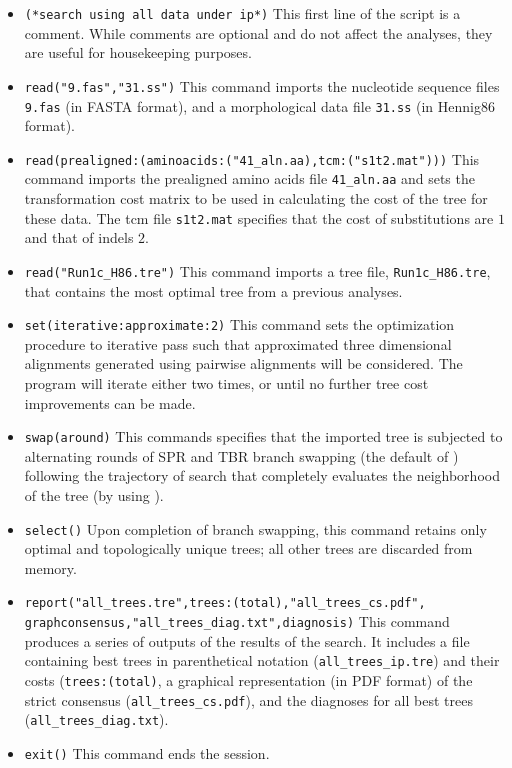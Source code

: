 \begin{itemize}
\item \texttt{(*search using all data under ip*)} This first line
of the script is a comment. While comments are optional and do not
affect the analyses, they are useful for housekeeping purposes.
\item \texttt{read("9.fas","31.ss")} This command imports the
nucleotide sequence files \texttt{9.fas} (in FASTA format), and a
morphological data file \texttt{31.ss} (in Hennig86 format).  
\item \texttt{read(prealigned:(aminoacids:("41\_aln.aa),tcm:("s1t2.mat")))}
This command imports the prealigned amino acids file \texttt{41\_aln.aa}
and sets the transformation cost matrix to be used in calculating
the cost of the tree for these data.  The tcm file \texttt{s1t2.mat}
specifies that the cost of substitutions are $1$ and that of indels
$2$.  
\item \texttt{read("Run1c\_H86.tre")} This command imports a
tree file, \texttt{Run1c\_H86.tre}, that contains the most optimal
tree from a previous analyses.  
\item \texttt{set(iterative:approximate:2)}
This command sets the optimization procedure to iterative pass such
that approximated three dimensional alignments generated using
pairwise alignments will be considered.  The program will iterate
either two times, or until no further tree cost improvements can
be made.  
\item \texttt{swap(around)} This commands specifies that
the imported tree is subjected to alternating rounds of SPR and TBR
branch swapping (the default of \poy) following the trajectory of
search that completely evaluates the neighborhood of the tree (by
using ).  
\item \texttt{select()} Upon completion
of branch swapping, this command retains only optimal and topologically
unique trees; all other trees are discarded from memory.  
\item \texttt{report("all\_trees.tre",trees:(total),"all\_trees\_cs.pdf",\\
graphconsensus,"all\_trees\_diag.txt",diagnosis)}
This command produces a series of outputs of the results of the
search. It includes a file containing best trees in parenthetical
notation (\texttt{all\_trees\_ip.tre}) and their costs
(\texttt{trees:(total)}, a graphical representation (in PDF format)
of the strict consensus (\texttt{all\_trees\_cs.pdf}), and the
diagnoses for all best trees (\texttt{all\_trees\_diag.txt}).  
\item \texttt{exit()} This command ends the \poy session.

\end{itemize}

